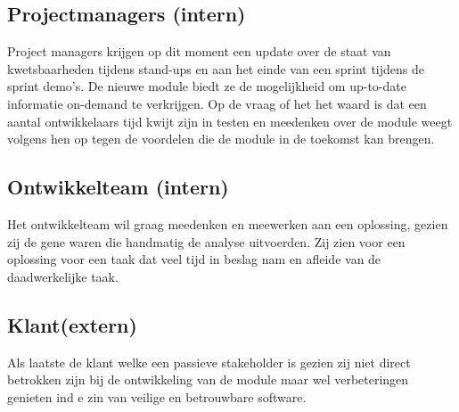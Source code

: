 \subsection{Projectmanagers (intern)}
Project managers krijgen op dit moment een update over de staat van kwetsbaarheden tijdens stand-ups en aan het einde van een sprint tijdens de sprint demo's. De nieuwe module biedt ze de mogelijkheid om up-to-date informatie on-demand te verkrijgen. Op de vraag of het het waard is dat een aantal ontwikkelaars tijd kwijt zijn in testen en meedenken over de module weegt volgens hen op tegen de voordelen die de module in de toekomst kan brengen.
\subsection{Ontwikkelteam (intern)}
Het ontwikkelteam wil graag meedenken en meewerken aan een oplossing, gezien zij de gene waren die handmatig de analyse uitvoerden. Zij zien voor een oplossing voor een taak dat veel tijd in beslag nam en afleide van de daadwerkelijke taak.

\subsection{Klant(extern)}
Als laatste de klant welke een passieve stakeholder is gezien zij niet direct betrokken zijn bij de ontwikkeling van de module maar wel verbeteringen genieten ind e zin van veilige en betrouwbare software.

